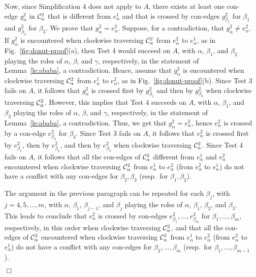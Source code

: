 \documentclass[letter,runningheads]{llncs}
\renewenvironment{proof}
{{\em Proof.\ }}{\hspace*{\fill}$\Box$\par\vspace{2mm}}
\begin{document}
\begin{proof}
Now, since {\sc Simplification 4} does not apply to $A$, there exists at least one con-edge $g^2_{\alpha}$ in ${\cal C}^2_{\alpha}$ that is different from $e^1_{\alpha}$ and that is crossed by con-edges $g^2_{\beta_1}$ for $\beta_1$ and $g^2_{\beta_3}$ for $\beta_3$. We prove that $g^2_{\alpha}=e^2_{\alpha}$. Suppose, for a contradiction, that $g^2_{\alpha}\neq e^2_{\alpha}$. If $g^2_{\alpha}$ is encountered when clockwise traversing ${\cal C}^2_{\alpha}$ from $e^2_{\alpha}$ to $e^1_{\alpha}$, as in Fig.~\ref{fig:donut-proof}(a), then {\sc Test 4} would succeed on $A$, with $\alpha$, $\beta_1$, and $\beta_2$ playing the roles of $\alpha$, $\beta$, and $\gamma$, respectively, in the statement of Lemma~\ref{le:ababa}, a contradiction. Hence, assume that $g^2_{\alpha}$ is encountered when clockwise traversing ${\cal C}^2_{\alpha}$ from $e^1_{\alpha}$ to $e^2_{\alpha}$, as in Fig.~\ref{fig:donut-proof}(b). Since {\sc Test 3} fails on $A$, it follows that $g^2_{\alpha}$ is crossed first by $g^2_{\beta_1}$ and then by $g^2_{\beta_3}$ when clockwise traversing ${\cal C}^2_{\alpha}$. However, this implies that {\sc Test 4} succeeds on $A$, with $\alpha$, $\beta_1$, and $\beta_3$ playing the roles of $\alpha$, $\beta$, and $\gamma$, respectively, in the statement of Lemma~\ref{le:ababa}, a contradiction. Thus, we get that $g^2_{\alpha}=e^2_{\alpha}$, hence $e^2_{\alpha}$ is crossed by a con-edge $e^2_{\beta_3}$ for $\beta_3$. Since {\sc Test 3} fails on $A$, it follows that $e^2_{\alpha}$ is crossed first by $e^2_{\beta_1}$, then by $e^2_{\beta_2}$, and then by $e^2_{\beta_3}$ when clockwise traversing ${\cal C}^2_{\alpha}$. Since {\sc Test 4} fails on $A$, it follows that all the con-edges of ${\cal C}^2_{\alpha}$ different from $e^1_{\alpha}$ and $e^{2}_{\alpha}$ encountered when clockwise traversing ${\cal C}^2_{\alpha}$ from $e^1_{\alpha}$ to $e^{2}_{\alpha}$ (from $e^2_{\alpha}$ to $e^1_{\alpha}$) do not have a conflict with any con-edges for $\beta_2,\beta_3$ (resp.\ for $\beta_1,\beta_2$).

The argument in the previous paragraph can be repeated for each $\beta_j$, with $j=4,5,\dots,m$, with $\alpha$, $\beta_1$, $\beta_{j-1}$, and $\beta_j$ playing the roles of  $\alpha$, $\beta_1$, $\beta_2$, and $\beta_3$. This leads to conclude that $e^2_{\alpha}$ is crossed by con-edges $e^2_{\beta_1},\dots,e^2_{\beta_m}$ for $\beta_1,\dots,\beta_m$, respectively, in this order when clockwise traversing ${\cal C}^2_{\alpha}$, and that all the con-edges of ${\cal C}^2_{\alpha}$ encountered when clockwise traversing ${\cal C}^2_{\alpha}$ from $e^1_{\alpha}$ to $e^2_{\alpha}$ (from $e^2_{\alpha}$ to $e^1_{\alpha}$) do not have a conflict with any con-edges for $\beta_2,\dots,\beta_m$ (resp.\ for $\beta_1,\dots,\beta_{m-1}$).


\end{proof}
\end{document}
